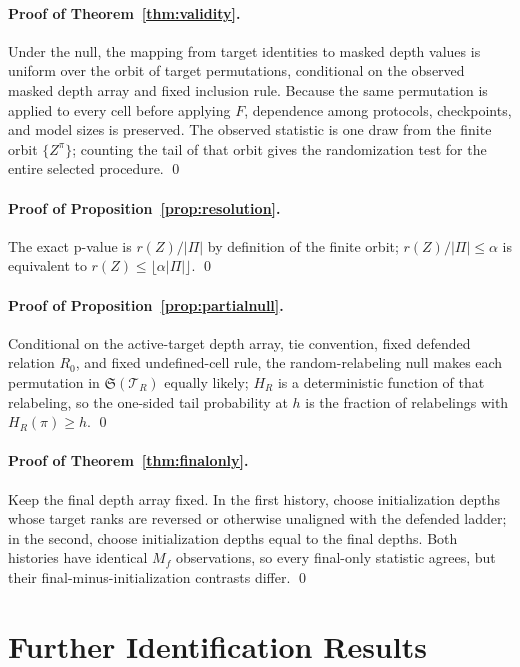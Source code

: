 \documentclass[11pt]{article}
\begin{document}
\paragraph{Proof of Theorem~\ref{thm:validity}.} Under the null, the mapping from target identities to masked depth values is uniform over the orbit of target permutations, conditional on the observed masked depth array and fixed inclusion rule. Because the same permutation is applied to every cell before applying $F$, dependence among protocols, checkpoints, and model sizes is preserved. The observed statistic is one draw from the finite orbit $\{Z^\pi\}$; counting the tail of that orbit gives the randomization test for the entire selected procedure. \qed

\paragraph{Proof of Proposition~\ref{prop:resolution}.} The exact p-value is $r(Z)/|\Pi|$ by definition of the finite orbit; $r(Z)/|\Pi|\le\alpha$ is equivalent to $r(Z)\le\lfloor\alpha|\Pi|\rfloor$. \qed

\paragraph{Proof of Proposition~\ref{prop:partialnull}.} Conditional on the active-target depth array, tie convention, fixed defended relation $R_0$, and fixed undefined-cell rule, the random-relabeling null makes each permutation in $\mathfrak{S}(\mathcal{T}_R)$ equally likely; $H_R$ is a deterministic function of that relabeling, so the one-sided tail probability at $h$ is the fraction of relabelings with $H_R(\pi)\ge h$. \qed

\paragraph{Proof of Theorem~\ref{thm:finalonly}.} Keep the final depth array fixed. In the first history, choose initialization depths whose target ranks are reversed or otherwise unaligned with the defended ladder; in the second, choose initialization depths equal to the final depths. Both histories have identical $M_f$ observations, so every final-only statistic agrees, but their final-minus-initialization contrasts differ. \qed

\section{Further Identification Results}
\label{app:identification}
\end{document}
